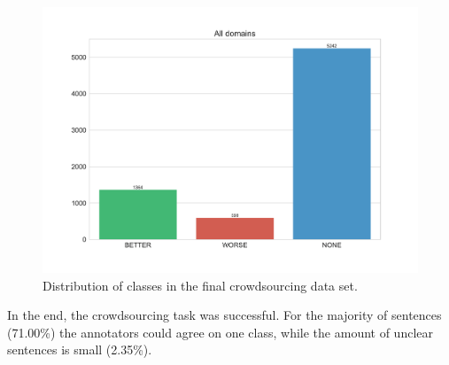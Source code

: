 \begin{figure}[htbp]
\centering
\caption{Distribution of classes in the final crowdsourcing data set.}
\label{fig:all_fin}
\includegraphics[width=1\textwidth]{images/dataset/Alldomains-dist}
\end{figure}

In the end, the crowdsourcing task was successful. For the majority of sentences (71.00\%) the annotators could agree on one class, while the amount of unclear sentences is small (2.35\%).
\FloatBarrier